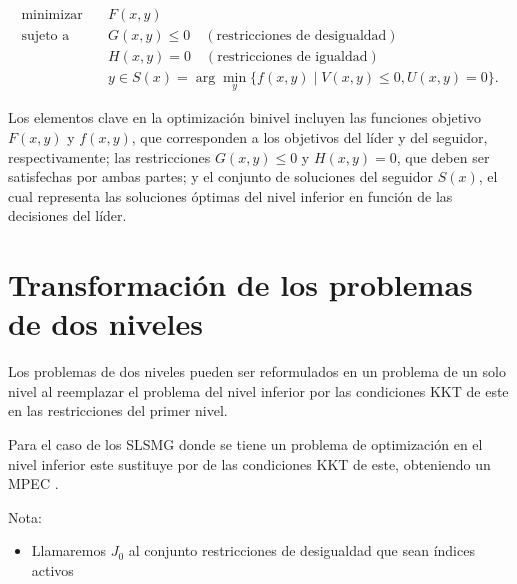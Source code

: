 \begin{equation}
\begin{aligned}
\text{minimizar} & \quad F(x, y) \\
\text{sujeto a} & \quad G(x, y) \leq 0 \quad (\text{restricciones de desigualdad}) \\
& \quad H(x, y) = 0 \quad (\text{restricciones de igualdad}) \\
& \quad y \in S(x) = \arg \min_{y} \{ f(x, y) \mid V(x, y) \leq 0, U(x, y) = 0 \}.
\end{aligned}
\end{equation}

Los elementos clave en la optimización binivel incluyen las funciones objetivo $F(x, y)$ y $f(x, y)$, que corresponden a los objetivos del líder y del seguidor, respectivamente; las restricciones $G(x, y) \leq 0$ y $H(x, y) = 0$, que deben ser satisfechas por ambas partes; y el conjunto de soluciones del seguidor $S(x)$, el cual representa las soluciones óptimas del nivel inferior en función de las decisiones del líder.

\section{Transformación de los problemas de dos niveles}
		
		Los problemas de dos niveles pueden ser reformulados en un problema de un solo nivel al reemplazar el problema del nivel inferior por las condiciones KKT de este en las restricciones del primer nivel. 
		
		Para el caso de los SLSMG donde se tiene un problema de optimización en el nivel inferior este sustituye por de las condiciones KKT de este, obteniendo un MPEC \autocite{aussel2020}.
		
        \begin{table}
				Nota:
        	\begin{itemize}
        	    \item Llamaremos $J_{0}$ al conjunto restricciones de desigualdad que sean índices activos
			
        	\end{itemize}
		\end{table}
        
